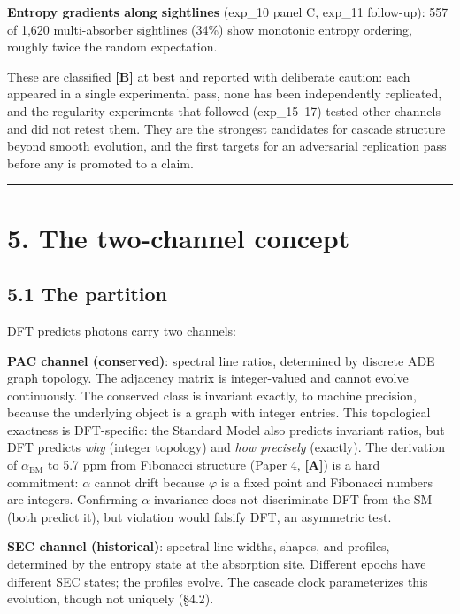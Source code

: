 \documentclass[11pt,a4paper]{article}
\begin{document}
\textbf{Entropy gradients along sightlines} (exp\_10 panel C, exp\_11 follow-up): 557 of 1,620 multi-absorber sightlines (34\%) show monotonic entropy ordering, roughly twice the random expectation.

These are classified \textbf{[B]} at best and reported with deliberate caution: each appeared in a single experimental pass, none has been independently replicated, and the regularity experiments that followed (exp\_15–17) tested other channels and did not retest them. They are the strongest candidates for cascade structure beyond smooth evolution, and the first targets for an adversarial replication pass before any is promoted to a claim.

\begin{center}\rule{0.5\linewidth}{0.4pt}\end{center}

\section*{5. The two-channel concept}

\subsection*{5.1 The partition}

DFT predicts photons carry two channels:

\textbf{PAC channel (conserved)}: spectral line ratios, determined by discrete ADE graph topology. The adjacency matrix is integer-valued and cannot evolve continuously. The conserved class is invariant exactly, to machine precision, because the underlying object is a graph with integer entries. This topological exactness is DFT-specific: the Standard Model also predicts invariant ratios, but DFT predicts \emph{why} (integer topology) and \emph{how precisely} (exactly). The derivation of $\alpha_{\text{EM}}$ to 5.7 ppm from Fibonacci structure (Paper 4, \textbf{[A]}) is a hard commitment: $\alpha$ cannot drift because $\varphi$ is a fixed point and Fibonacci numbers are integers. Confirming $\alpha$-invariance does not discriminate DFT from the SM (both predict it), but violation would falsify DFT, an asymmetric test.

\textbf{SEC channel (historical)}: spectral line widths, shapes, and profiles, determined by the entropy state at the absorption site. Different epochs have different SEC states; the profiles evolve. The cascade clock parameterizes this evolution, though not uniquely (§4.2).
\end{document}
